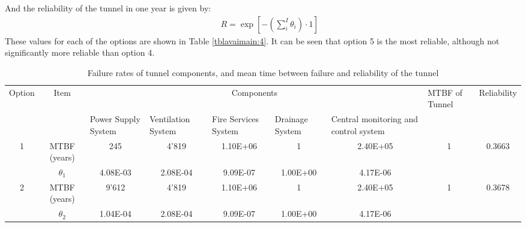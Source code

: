 And the reliability of the tunnel in one year is given by:
\begin{eqnarray}
&& R = \exp \left[ { - \left( {\sum\limits_i^I {{\theta _i}} } \right) \cdot 1}
\right]
\label{avaimaineq:10}
\end{eqnarray}
These values for each of the options are shown in Table \ref{tblavaimain:4}. It can be
seen that option 5 is the most reliable, although not significantly more reliable
than option 4.
\begin{table}[h]
\caption{Failure rates of tunnel components, and mean time between failure and reliability of the tunnel}
\begin{tabular}{|l|l|l|l|l|l|l|l|l|}
\hline
\multicolumn{1}{|c|}{Option} & \multicolumn{1}{c|}{Item} & \multicolumn{5}{c|}{Components} & \multicolumn{1}{m{1.2cm}|}{MTBF of Tunnel} & \multicolumn{1}{c|}{Reliability} \\ 
\cline{3-7}
\multicolumn{1}{|c|}{} & \multicolumn{1}{c|}{} & \multicolumn{1}{m{1.2cm}|}{Power Supply System} & \multicolumn{1}{m{1.2cm}|}{Ventilation System} & \multicolumn{1}{m{1.2cm}|}{Fire Services System} & \multicolumn{1}{m{1.2cm}|}{Drainage System} & \multicolumn{1}{m{1.5cm}|}{Central monitoring and control system} & \multicolumn{1}{c|}{} & \multicolumn{1}{c|}{} \\ 
\hline
\multicolumn{1}{|c|}{1} & \multicolumn{1}{c|}{MTBF (years)} & \multicolumn{1}{c|}{245} & \multicolumn{1}{c|}{4'819} & \multicolumn{1}{c|}{1.10E+06} & \multicolumn{1}{c|}{1} & \multicolumn{1}{c|}{2.40E+05} & \multicolumn{1}{c|}{1} & \multicolumn{1}{c|}{0.3663} \\ 
\cline{2-7}
\multicolumn{1}{|c|}{} & \multicolumn{1}{c|}{$\theta_1$} & \multicolumn{1}{c|}{4.08E-03} & \multicolumn{1}{c|}{2.08E-04} & \multicolumn{1}{c|}{9.09E-07} & \multicolumn{1}{c|}{1.00E+00} & \multicolumn{1}{c|}{4.17E-06} & \multicolumn{1}{c|}{} & \multicolumn{1}{c|}{} \\ 
\hline
\multicolumn{1}{|c|}{2} & \multicolumn{1}{c|}{MTBF (years)} & \multicolumn{1}{c|}{9'612} & \multicolumn{1}{c|}{4'819} & \multicolumn{1}{c|}{1.10E+06} & \multicolumn{1}{c|}{1} & \multicolumn{1}{c|}{2.40E+05} & \multicolumn{1}{c|}{1} & \multicolumn{1}{c|}{0.3678} \\ 
\cline{2-7}
\multicolumn{1}{|c|}{} & \multicolumn{1}{c|}{$\theta_2$} & \multicolumn{1}{c|}{1.04E-04} & \multicolumn{1}{c|}{2.08E-04} & \multicolumn{1}{c|}{9.09E-07} & \multicolumn{1}{c|}{1.00E+00} & \multicolumn{1}{c|}{4.17E-06} & \multicolumn{1}{c|}{} & \multicolumn{1}{c|}{} \\ 

\end{tabular}
\end{table}
